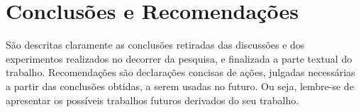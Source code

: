 \chapter{Conclusões e Recomendações}
\label{cap:05}

São descritas claramente as conclusões retiradas das discussões e dos experimentos realizados no decorrer da pesquisa,
e finalizada a parte textual do trabalho. Recomendações são declarações concisas de ações, julgadas necessárias a partir das conclusões obtidas,
a serem usadas no futuro. Ou seja, lembre-se de apresentar os possíveis trabalhos futuros derivados do seu trabalho.
